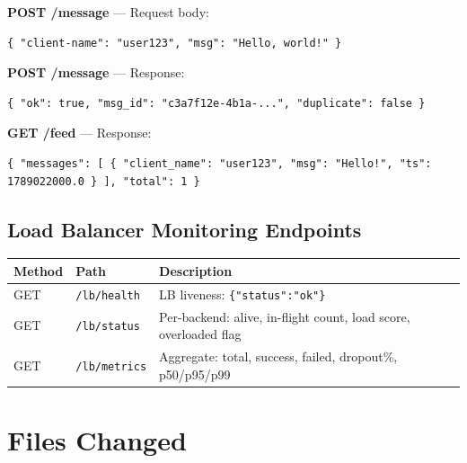\documentclass[12pt,a4paper]{article}
\begin{document}
\textbf{POST /message} --- Request body:
\begin{lstlisting}
{ "client-name": "user123", "msg": "Hello, world!" }
\end{lstlisting}

\textbf{POST /message} --- Response:
\begin{lstlisting}
{ "ok": true, "msg_id": "c3a7f12e-4b1a-...", "duplicate": false }
\end{lstlisting}

\textbf{GET /feed} --- Response:
\begin{lstlisting}
{ "messages": [ { "client_name": "user123", "msg": "Hello!", "ts": 1789022000.0 } ], "total": 1 }
\end{lstlisting}

\subsection{Load Balancer Monitoring Endpoints}

\begin{center}
\begin{tabular}{lll}
\toprule
\textbf{Method} & \textbf{Path} & \textbf{Description} \\
\midrule
GET & \texttt{/lb/health}  & LB liveness: \texttt{\{"status":"ok"\}} \\
GET & \texttt{/lb/status}  & Per-backend: alive, in-flight count, load score, overloaded flag \\
GET & \texttt{/lb/metrics} & Aggregate: total, success, failed, dropout\%, p50/p95/p99 \\
\bottomrule
\end{tabular}
\end{center}

\section{Files Changed}
\end{document}
